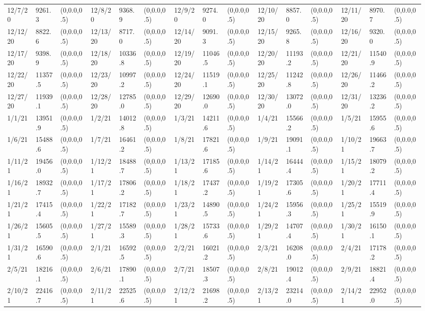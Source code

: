 \documentclass[12pt]{article}
\begin{document}
\begin{table}
\begin{center}
\begin{tabular}{p{15pt}p{15pt}p{25pt}p{15pt}p{15pt}p{25pt}p{15pt}p{15pt}p{25pt}p{15pt}p{15pt}p{25pt}p{15pt}p{15pt}p{25pt}}
                12/7/20&9261.3&(0,0.0,0.5)&12/8/20&9368.9&(0,0.0,0.5)&12/9/20&9274.0&(0,0.0,0.5)&12/10/20&8857.0&(0,0.0,0.5)&12/11/20&8970.7&(0,0.0,0.5)\\
                12/12/20&8822.6&(0,0.0,0.5)&12/13/20&8717.0&(0,0.0,0.5)&12/14/20&9091.3&(0,0.0,0.5)&12/15/20&9265.8&(0,0.0,0.5)&12/16/20&9320.0&(0,0.0,0.5)\\
                12/17/20&9398.9&(0,0.0,0.5)&12/18/20&10336.8&(0,0.0,0.5)&12/19/20&11046.5&(0,0.0,0.5)&12/20/20&11193.2&(0,0.0,0.5)&12/21/20&11540.9&(0,0.0,0.5)\\
                12/22/20&11357.5&(0,0.0,0.5)&12/23/20&10997.2&(0,0.0,0.5)&12/24/20&11519.1&(0,0.0,0.5)&12/25/20&11242.8&(0,0.0,0.5)&12/26/20&11466.2&(0,0.0,0.5)\\
                12/27/20&11939.1&(0,0.0,0.5)&12/28/20&12785.0&(0,0.0,0.5)&12/29/20&12690.0&(0,0.0,0.5)&12/30/20&13072.0&(0,0.0,0.5)&12/31/20&13236.2&(0,0.0,0.5)\\
                1/1/21&13951.9&(0,0.0,0.5)&1/2/21&14012.8&(0,0.0,0.5)&1/3/21&14211.6&(0,0.0,0.5)&1/4/21&15566.2&(0,0.0,0.5)&1/5/21&15955.6&(0,0.0,0.5)\\
                1/6/21&15488.6&(0,0.0,0.5)&1/7/21&16461.2&(0,0.0,0.5)&1/8/21&17821.6&(0,0.0,0.5)&1/9/21&19091.1&(0,0.0,0.5)&1/10/21&19663.7&(0,0.0,0.5)\\
                1/11/21&19456.0&(0,0.0,0.5)&1/12/21&18488.7&(0,0.0,0.5)&1/13/21&17185.6&(0,0.0,0.5)&1/14/21&16444.4&(0,0.0,0.5)&1/15/21&18079.2&(0,0.0,0.5)\\
                1/16/21&18932.7&(0,0.0,0.5)&1/17/21&17806.2&(0,0.0,0.5)&1/18/21&17437.2&(0,0.0,0.5)&1/19/21&17305.6&(0,0.0,0.5)&1/20/21&17711.4&(0,0.0,0.5)\\
                1/21/21&17415.4&(0,0.0,0.5)&1/22/21&17182.7&(0,0.0,0.5)&1/23/21&14890.5&(0,0.0,0.5)&1/24/21&15956.3&(0,0.0,0.5)&1/25/21&15519.9&(0,0.0,0.5)\\
                1/26/21&15605.5&(0,0.0,0.5)&1/27/21&15589.3&(0,0.0,0.5)&1/28/21&15733.6&(0,0.0,0.5)&1/29/21&14707.4&(0,0.0,0.5)&1/30/21&16150.1&(0,0.0,0.5)\\
                1/31/21&16590.6&(0,0.0,0.5)&2/1/21&16592.5&(0,0.0,0.5)&2/2/21&16021.2&(0,0.0,0.5)&2/3/21&16208.0&(0,0.0,0.5)&2/4/21&17178.2&(0,0.0,0.5)\\
                2/5/21&18216.1&(0,0.0,0.5)&2/6/21&17890.1&(0,0.0,0.5)&2/7/21&18507.3&(0,0.0,0.5)&2/8/21&19012.4&(0,0.0,0.5)&2/9/21&18821.4&(0,0.0,0.5)\\
                2/10/21&22416.7&(0,0.0,0.5)&2/11/21&22525.6&(0,0.0,0.5)&2/12/21&21698.2&(0,0.0,0.5)&2/13/21&23214.0&(0,0.0,0.5)&2/14/21&22952.0&(0,0.0,0.5)\\

\end{tabular}
\end{center}
\end{table}
\end{document}
